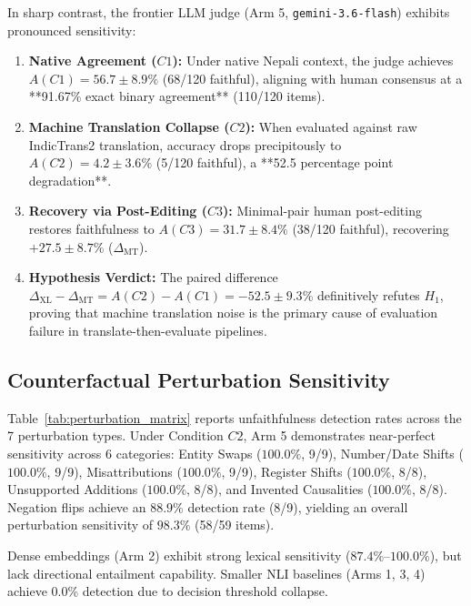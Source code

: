 \documentclass[conference]{IEEEtran}
\begin{document}
In sharp contrast, the frontier LLM judge (Arm 5, \texttt{gemini-3.6-flash}) exhibits pronounced sensitivity:
\begin{enumerate}
    \item \textbf{Native Agreement ($C1$):} Under native Nepali context, the judge achieves $A(C1) = 56.7 \pm 8.9\%$ (68/120 faithful), aligning with human consensus at a **91.67\% exact binary agreement** (110/120 items).
    \item \textbf{Machine Translation Collapse ($C2$):} When evaluated against raw IndicTrans2 translation, accuracy drops precipitously to $A(C2) = 4.2 \pm 3.6\%$ (5/120 faithful), a **52.5 percentage point degradation**.
    \item \textbf{Recovery via Post-Editing ($C3$):} Minimal-pair human post-editing restores faithfulness to $A(C3) = 31.7 \pm 8.4\%$ (38/120 faithful), recovering $+27.5 \pm 8.7\%$ ($\Delta_{\text{MT}}$).
    \item \textbf{Hypothesis Verdict:} The paired difference $\Delta_{\text{XL}} - \Delta_{\text{MT}} = A(C2) - A(C1) = \mathbf{-52.5 \pm 9.3\%}$ definitively refutes $H_1$, proving that machine translation noise is the primary cause of evaluation failure in translate-then-evaluate pipelines.
\end{enumerate}

\subsection{Counterfactual Perturbation Sensitivity}



Table~\ref{tab:perturbation_matrix} reports unfaithfulness detection rates across the 7 perturbation types. Under Condition $C2$, Arm 5 demonstrates near-perfect sensitivity across 6 categories: Entity Swaps ($100.0\%$, 9/9), Number/Date Shifts ($100.0\%$, 9/9), Misattributions ($100.0\%$, 9/9), Register Shifts ($100.0\%$, 8/8), Unsupported Additions ($100.0\%$, 8/8), and Invented Causalities ($100.0\%$, 8/8). Negation flips achieve an $88.9\%$ detection rate (8/9), yielding an overall perturbation sensitivity of $98.3\%$ (58/59 items).

Dense embeddings (Arm 2) exhibit strong lexical sensitivity ($87.4\%$--$100.0\%$), but lack directional entailment capability. Smaller NLI baselines (Arms 1, 3, 4) achieve 0.0\% detection due to decision threshold collapse.
\end{document}

